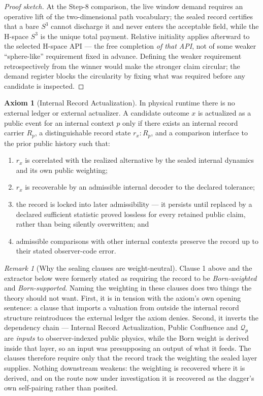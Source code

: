 \documentclass[11pt]{article}
\theoremstyle{plain}
\theoremstyle{definition}
\newtheorem{axiom}[theorem]{Axiom}
\theoremstyle{remark}
\newtheorem{remark}[theorem]{Remark}
\newenvironment{proofsketch}{\begin{proof}[Proof sketch]}{\end{proof}}
\begin{document}
\begin{proofsketch}
At the Step-8 comparison, the live window demand requires an operative lift of the two-dimensional path vocabulary; the sealed record certifies that a bare \(S^3\) cannot discharge it and never enters the acceptable field, while the H-space \(S^3\) is the unique total payment. Relative initiality applies afterward to the selected H-space API --- the free completion \emph{of that API}, not of some weaker ``sphere-like'' requirement fixed in advance. Defining the weaker requirement retrospectively from the winner would make the stronger claim circular; the demand register blocks the circularity by fixing what was required before any candidate is inspected.
\end{proofsketch}

\begin{axiom}[Internal Record Actualization]
In physical runtime there is no external ledger or external actualizer. A candidate outcome \(x\) is actualized as a public event for an internal context \(p\) only if there exists an internal record carrier \(R_p\), a distinguishable record state \(r_x:R_p\), and a comparison interface to the prior public history such that:
\begin{enumerate}[leftmargin=*]
\item \(r_x\) is correlated with the realized alternative by the sealed internal dynamics and its own public weighting;
\item \(r_x\) is recoverable by an admissible internal decoder to the declared tolerance;
\item the record is locked into later admissibility --- it persists until replaced by a declared sufficient statistic proved lossless for every retained public claim, rather than being silently overwritten; and
\item admissible comparisons with other internal contexts preserve the record up to their stated observer-code error.
\end{enumerate}
\end{axiom}

\begin{remark}[Why the sealing clauses are weight-neutral]
Clause 1 above and the extractor below were formerly stated as requiring the
record to be \emph{Born-weighted} and \emph{Born-supported}. Naming the weighting
in these clauses does two things the theory should not want. First, it is in
tension with the axiom's own opening sentence: a clause that imports a valuation
from outside the internal record structure reintroduces the external ledger the
axiom denies. Second, it inverts the dependency chain --- Internal Record
Actualization, Public Confluence and \(\mathcal Q_p\) are \emph{inputs} to
observer-indexed public physics, while the Born weight is derived inside that
layer, so an input was presupposing an output of what it feeds. The clauses
therefore require only that the record track the weighting the sealed layer
supplies. Nothing downstream weakens: the weighting is recovered where it is
derived, and on the route now under investigation it is recovered as the
dagger's own self-pairing rather than posited.
\end{remark}
\end{document}
